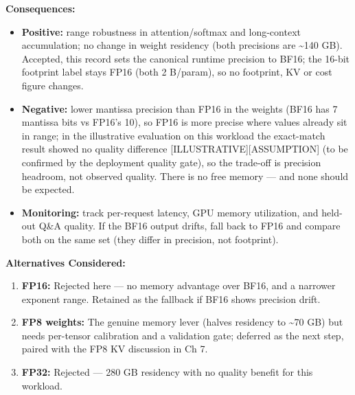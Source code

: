 \textbf{Consequences:}

\begin{itemize}
\tightlist
\item
  \textbf{Positive:} range robustness in attention/softmax and
  long-context accumulation; no change in weight residency (both
  precisions are \textasciitilde140 GB). Accepted, this record sets the
  canonical runtime precision to BF16; the 16-bit footprint label stays
  FP16 (both 2 B/param), so no footprint, KV or cost figure changes.
\item
  \textbf{Negative:} lower mantissa precision than FP16 in the weights
  (BF16 has 7 mantissa bits vs FP16's 10), so FP16 is more precise where
  values already sit in range; in the illustrative evaluation on this
  workload the exact-match result showed no quality difference
  \mbox{{[}ILLUSTRATIVE{]}}\hspace{0pt}\mbox{{[}ASSUMPTION{]}} (to be confirmed by the deployment
  quality gate), so the trade-off is precision headroom, not observed
  quality. There is no free memory --- and none should be expected.
\item
  \textbf{Monitoring:} track per-request latency, GPU memory
  utilization, and held-out Q\&A quality. If the BF16 output drifts,
  fall back to FP16 and compare both on the same set (they differ in
  precision, not footprint).
\end{itemize}

\textbf{Alternatives Considered:}

\begin{enumerate}
\def\labelenumi{\arabic{enumi}.}
\tightlist
\item
  \textbf{FP16:} Rejected here --- no memory advantage over BF16, and a
  narrower exponent range. Retained as the fallback if BF16 shows
  precision drift.
\item
  \textbf{FP8 weights:} The genuine memory lever (halves residency to
  \textasciitilde70 GB) but needs per-tensor calibration and a
  validation gate; deferred as the next step, paired with the FP8 KV
  discussion in Ch 7.
\item
  \textbf{FP32:} Rejected --- 280 GB residency with no quality benefit
  for this workload.
\end{enumerate}

